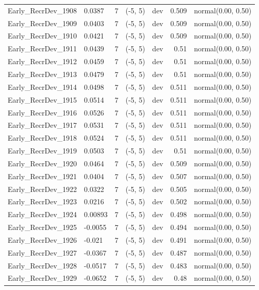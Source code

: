 \documentclass[
]{scrartcl}
\begin{document}
\begin{longtable}{llrllrl}
Early\_RecrDev\_1908 & 0.0387 & 7 & (-5, 5) & dev & 0.509 & normal(0.00, 0.50) \\ 
Early\_RecrDev\_1909 & 0.0403 & 7 & (-5, 5) & dev & 0.509 & normal(0.00, 0.50) \\ 
Early\_RecrDev\_1910 & 0.0421 & 7 & (-5, 5) & dev & 0.509 & normal(0.00, 0.50) \\ 
Early\_RecrDev\_1911 & 0.0439 & 7 & (-5, 5) & dev & 0.51 & normal(0.00, 0.50) \\ 
Early\_RecrDev\_1912 & 0.0459 & 7 & (-5, 5) & dev & 0.51 & normal(0.00, 0.50) \\ 
Early\_RecrDev\_1913 & 0.0479 & 7 & (-5, 5) & dev & 0.51 & normal(0.00, 0.50) \\ 
Early\_RecrDev\_1914 & 0.0498 & 7 & (-5, 5) & dev & 0.511 & normal(0.00, 0.50) \\ 
Early\_RecrDev\_1915 & 0.0514 & 7 & (-5, 5) & dev & 0.511 & normal(0.00, 0.50) \\ 
Early\_RecrDev\_1916 & 0.0526 & 7 & (-5, 5) & dev & 0.511 & normal(0.00, 0.50) \\ 
Early\_RecrDev\_1917 & 0.0531 & 7 & (-5, 5) & dev & 0.511 & normal(0.00, 0.50) \\ 
Early\_RecrDev\_1918 & 0.0524 & 7 & (-5, 5) & dev & 0.511 & normal(0.00, 0.50) \\ 
Early\_RecrDev\_1919 & 0.0503 & 7 & (-5, 5) & dev & 0.51 & normal(0.00, 0.50) \\ 
Early\_RecrDev\_1920 & 0.0464 & 7 & (-5, 5) & dev & 0.509 & normal(0.00, 0.50) \\ 
Early\_RecrDev\_1921 & 0.0404 & 7 & (-5, 5) & dev & 0.507 & normal(0.00, 0.50) \\ 
Early\_RecrDev\_1922 & 0.0322 & 7 & (-5, 5) & dev & 0.505 & normal(0.00, 0.50) \\ 
Early\_RecrDev\_1923 & 0.0216 & 7 & (-5, 5) & dev & 0.502 & normal(0.00, 0.50) \\ 
Early\_RecrDev\_1924 & 0.00893 & 7 & (-5, 5) & dev & 0.498 & normal(0.00, 0.50) \\ 
Early\_RecrDev\_1925 & -0.0055 & 7 & (-5, 5) & dev & 0.494 & normal(0.00, 0.50) \\ 
Early\_RecrDev\_1926 & -0.021 & 7 & (-5, 5) & dev & 0.491 & normal(0.00, 0.50) \\ 
Early\_RecrDev\_1927 & -0.0367 & 7 & (-5, 5) & dev & 0.487 & normal(0.00, 0.50) \\ 
Early\_RecrDev\_1928 & -0.0517 & 7 & (-5, 5) & dev & 0.483 & normal(0.00, 0.50) \\ 
Early\_RecrDev\_1929 & -0.0652 & 7 & (-5, 5) & dev & 0.48 & normal(0.00, 0.50) \\ 

\end{longtable}
\end{document}
